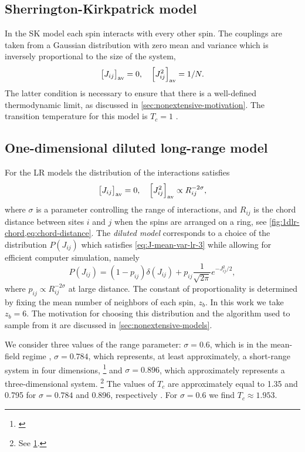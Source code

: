 \subsection{Sherrington-Kirkpatrick model}

In the SK model each spin interacts with every other spin. The couplings
are taken from a Gaussian distribution with zero mean and variance which
is inversely proportional to the size of the system,
\begin{equation}
  \left[J_{ij}\right]_{\mathrm{av}}=0,\quad
  \left[J_{ij}^2\right]_{\mathrm{av}}=1/N.
\end{equation}
The latter condition is necessary to ensure that there is a well-defined
thermodynamic limit, as discussed in \cref{sec:nonextensive-motivation}. The
transition temperature for this model is $T_c=1$
\autocite{sherrington1975solvable}.


\subsection{One-dimensional diluted long-range model}

For the LR models the distribution of the interactions satisfies
\begin{equation}
  \left[J_{ij}\right]_{\mathrm{av}} = 0,\quad
  \left[J_{ij}^2\right]_{\mathrm{av}} \propto R_{ij}^{-2\sigma},
  \label{eq:J-mean-var-lr-3}
\end{equation}
where $\sigma$ is a parameter controlling the range of interactions, and
$R_{ij}$ is the chord distance between sites $i$ and $j$ when the spins are
arranged on a ring, see \cref{fig:1dlr-chord,eq:chord-distance}. The
\emph{diluted model} corresponds to a choice of the distribution $P(J_{ij})$
which satisfies \cref{eq:J-mean-var-lr-3} while allowing for efficient computer
simulation, namely
\begin{equation}
  P(J_{ij})
  = (1-p_{ij})\delta(J_{ij}) + p_{ij}\frac{1}{\sqrt{2\pi}} e^{-J_{ij}^2/2},
\end{equation}
where $p_{ij} \propto R_{ij}^{-2\sigma}$ at large distance. The constant of
proportionality is determined by fixing the mean number of neighbors of each
spin, $z_b$. In this work we take $z_b=6$. The motivation for choosing this
distribution and the algorithm used to sample from it are discussed in
\cref{sec:nonextensive-models}.

We consider three values of the range parameter: $\sigma=0.6$, which is in the
mean-field regime \autocite{larson2010numerical}, $\sigma=0.784$, which
represents, at least approximately, a short-range system in four dimensions,%
\footnote{%
  \label{note:equiv}
  \textcite{%
    larson2010numerical,%
    banos2012correspondence,%
    katzgraber2009ultrametricity,%
    larson2013spin%
  }
}
and $\sigma=0.896$, which approximately represents a three-dimensional system.%
\footnote{See \cref{note:equiv}.}
The values of $T_c$ are approximately equal to 1.35 and 0.795 for $\sigma=0.784$
and 0.896, respectively \autocite{larson2013spin}. For $\sigma=0.6$ we find
$T_c \approx 1.953$.


